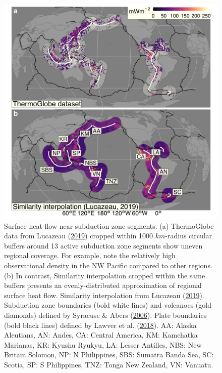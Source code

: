 \begin{figure}[htbp]

{\centering \includegraphics[width=1\linewidth,]{assets/figs/chpt3/ThermoGlobeBufferComp} 

}

\caption[Similarity interpolation of near 13 active subduction zone segments]{Surface heat flow near subduction zone segments. (a) ThermoGlobe data from Lucazeau (\protect\hyperlink{ref-lucazeau2019}{2019}) cropped within 1000 \(km\)-radius circular buffers around 13 active subduction zone segments show uneven regional coverage. For example, note the relatively high observational density in the NW Pacific compared to other regions. (b) In contrast, Similarity interpolation cropped within the same buffers presents an evenly-distributed approximation of regional surface heat flow. Similarity interpolation from Lucazeau (\protect\hyperlink{ref-lucazeau2019}{2019}). Subduction zone boundaries (bold white lines) and volcanoes (gold diamonds) defined by Syracuse \& Abers (\protect\hyperlink{ref-syracuse2006}{2006}). Plate boundaries (bold black lines) defined by Lawver et al. (\protect\hyperlink{ref-lawver2018}{2018}). AA: Alaska Aleutians, AN: Andes, CA: Central America, KM: Kamchatka Marianas, KR: Kyushu Ryukyu, LA: Lesser Antilles, NBS: New Britain Solomon, NP: N Philippines, SBS: Sumatra Banda Sea, SC: Scotia, SP: S Philippines, TNZ: Tonga New Zealand, VN: Vanuatu.}\label{fig:globalhfComp}
\end{figure}

